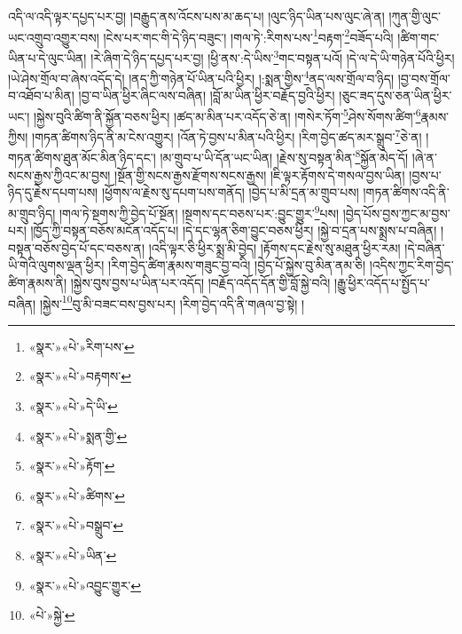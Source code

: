 འདི་ལ་འདི་ལྟར་དཔྱད་པར་བྱ། །བརྒྱུད་ནས་འོངས་པས་མ་ཆད་པ། །ལུང་ཉིད་ཡིན་པས་ལུང་ཞེ་ན། །ཀུན་གྱི་ལུང་ཡང་འགྲུབ་འགྱུར་བས། །ངེས་པར་གང་གི་དེ་ཉིད་བཟུང་། །གལ་ཏེ་:རིགས་པས་\footnote{«སྣར་»«པེ་»རིག་པས་}བརྟག་\footnote{«སྣར་»«པེ་»བརྟགས་}བཟོད་པའི། །ཚིག་གང་ཡིན་པ་དེ་ལུང་ཡིན། །རེ་ཞིག་དེ་ཉིད་དཔྱད་པར་བྱ། །ཕྱི་ནས་:དེ་ཡིས་\footnote{«སྣར་»«པེ་»དེ་ཡི་}གང་བསྟན་པའོ། །དེ་ལ་དེ་ཡི་གཉེན་པོའི་ཕྱིར། །ཡེ་ཤེས་གྲོལ་བ་ཞེས་འདོད་དེ། །ནད་ཀྱི་གཉེན་པོ་ཡིན་པའི་ཕྱིར། །:སྨན་གྱིས་\footnote{«སྣར་»«པེ་»སྨན་གྱི་}ནད་ལས་གྲོལ་བ་ཉིད། །བྱ་བས་གྲོལ་བ་འཐོབ་པ་མིན། །བྱ་བ་ཡིན་ཕྱིར་ཞིང་ལས་བཞིན། །བློ་མ་ཡིན་ཕྱིར་བརྗོད་བྱའི་ཕྱིར། །ཅུང་ཟད་དུས་ཅན་ཡིན་ཕྱིར་ཡང་། །སྐྱེས་བུའི་ཚིག་ནི་སྐྱོན་བཅས་ཕྱིར། །ཚད་མ་མིན་པར་འདོད་ཅེ་ན། །གསེར་ཏོག་\footnote{«སྣར་»«པེ་»རྟོག་}ཤེས་སོགས་ཚིག་\footnote{«སྣར་»«པེ་»ཚིགས་}རྣམས་ཀྱིས། །གཏན་ཚིགས་ཉིད་ནི་མ་ངེས་འགྱུར། །འོན་ཏེ་བྱས་པ་མིན་པའི་ཕྱིར། །རིག་བྱེད་ཚད་མར་སྒྲུབ་\footnote{«སྣར་»«པེ་»བསྒྲུབ་}ཅེ་ན། །གཏན་ཚིགས་ཐུན་མོང་མིན་ཉིད་དང་། །མ་གྲུབ་པ་ཡི་དོན་ཡང་ཡིན། །རྗེས་སུ་བསྟན་མིན་\footnote{«སྣར་»«པེ་»ཡིན་}སྐྱོན་མེད་དོ། །ཞེ་ན་སངས་རྒྱས་ཀྱིའང་མ་བྱས། །སྔོན་གྱི་སངས་རྒྱས་རྫོགས་སངས་རྒྱས། །ཇི་ལྟར་རྟོགས་དེ་གསལ་བྱས་ཡིན། །བྱས་པ་ཉིད་དུ་རྗེས་དཔག་པས། །ཕྱོགས་ལ་རྗེས་སུ་དཔག་པས་གནོད། །བྱེད་པ་མི་དྲན་མ་གྲུབ་པས། །གཏན་ཚིགས་འདི་ནི་མ་གྲུབ་ཉིད། །གལ་ཏེ་སྔགས་ཀྱི་བྱེད་པོ་སྔོན། །སྔགས་དང་བཅས་པར་:བྱུང་གྱུར་\footnote{«སྣར་»«པེ་»འབྱུང་གྱུར་}པས། །བྱེད་པོས་བྱས་ཀྱང་མ་བྱས་པར། །ཁྱོད་ཀྱི་བསྟན་བཅོས་མངོན་འདོད་པ། །དེ་དང་ལྷན་ཅིག་བྱུང་བཅས་ཕྱིར། །སྐྱེ་བ་དྲན་པས་སྨྲས་པ་བཞིན། །བསྟན་བཅོས་བྱེད་པོ་དང་བཅས་ན། །འདི་ལྟར་ཅི་ཕྱིར་སྨྲ་མི་བྱེད། །རྟོགས་དང་རྗེས་སུ་མཐུན་ཕྱིར་རམ། །དེ་བཞིན་ཡི་གེའི་ལུགས་ལྡན་ཕྱིར། །རིག་བྱེད་ཚིག་རྣམས་གཟུང་བྱ་བའི། །བྱེད་པོ་སྐྱེས་བུ་མིན་ནམ་ཅི། །འདིས་ཀྱང་རིག་བྱེད་ཚིག་རྣམས་ནི། །སྐྱེས་བུས་བྱས་པ་ཡིན་པར་འདོད། །བརྗོད་འདོད་དོན་གྱི་བློ་སྐྱེ་བའི། །རྒྱུ་ཕྱིར་འདོད་པ་སྤྱོད་པ་བཞིན། །སྐྱེས་\footnote{«པེ་»སྐྱེ་}བུ་མི་བཟང་བས་བྱས་པར། །རིག་བྱེད་འདི་ནི་གཞལ་བྱ་སྟེ། །

